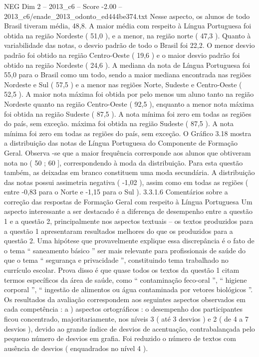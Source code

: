 \begin{textsample}{NEG Dim 2 – 2013\_c6 – Score -2.00 – 2013\_c6/enade\_2013\_odonto\_ed444be374.txt}
Nesse aspecto, os alunos de todo Brasil tiveram média, 48,8.
A maior média com respeito à Língua Portuguesa foi obtida na região Nordeste ( 51,0 ), e a menor, na região norte ( 47,3 ).
Quanto à variabilidade das notas, o desvio padrão de todo o Brasil foi 22,2.
O menor desvio padrão foi obtido na região Centro-Oeste ( 19,6 ) e o maior desvio padrão foi obtido na região Nordeste ( 24,6 ).
A mediana da nota de Língua Portuguesa foi 55,0 para o Brasil como um todo, sendo a maior mediana encontrada nas regiões Nordeste e Sul ( 57,5 ) e a menor nas regiões Norte, Sudeste e Centro-Oeste ( 52,5 ).
A maior nota máxima foi obtida por pelo menos um aluno tanto na região Nordeste quanto na região Centro-Oeste ( 92,5 ), enquanto a menor nota máxima foi obtida na região Sudeste ( 87,5 ).
A nota mínima foi zero em todas as regiões do país, sem exceção. máxima foi obtida na região Sudeste ( 87,5 ).
A nota mínima foi zero em todas as regiões do país, sem exceção.
O Gráfico 3.18 mostra a distribuição das notas de Língua Portuguesa do Componente de Formação Geral.
Observa -se que a maior frequência corresponde aos alunos que obtiveram nota no ( 50 ; 60 ], correspondendo à moda da distribuição.
Para esta questão também, as deixadas em branco constituem uma moda secundária.
A distribuição das notas possui assimetria negativa ( -1,02 ), assim como em todas as regiões ( entre -0,83 para o Norte e -1,15 para o Sul ). 3.3.1.6 Comentários sobre a correção das respostas de Formação Geral com respeito à Língua Portuguesa Um aspecto interessante a ser destacado é a diferença de desempenho entre a questão 1 e a questão 2, principalmente nos aspectos textuais – os textos produzidos para a questão 1 apresentaram resultados melhores do que os produzidos para a questão 2.
Uma hipótese que provavelmente explique essa discrepância é o fato de o tema “ saneamento básico ” ser mais relevante para profissionais de saúde do que o tema “ segurança e privacidade ”, constituindo tema trabalhado no currículo escolar.
Prova disso é que quase todos os textos da questão 1 citam termos específicos da área de saúde, como “ contaminação feco-oral ”, “ higiene corporal ”, “ ingestão de alimentos ou água contaminada por vetores biológicos ”.
Os resultados da avaliação correspondem aos seguintes aspectos observados em cada competência : a ) aspectos ortográficos : o desempenho dos participantes ficou concentrado, majoritariamente, nos níveis 3 ( até 3 desvios ) e 2 ( de 4 a 7 desvios ), devido ao grande índice de desvios de acentuação, contrabalançada pelo pequeno número de desvios em grafia.
Foi reduzido o número de textos com ausência de desvios ( enquadrados no nível 4 ).

\end{textsample}
